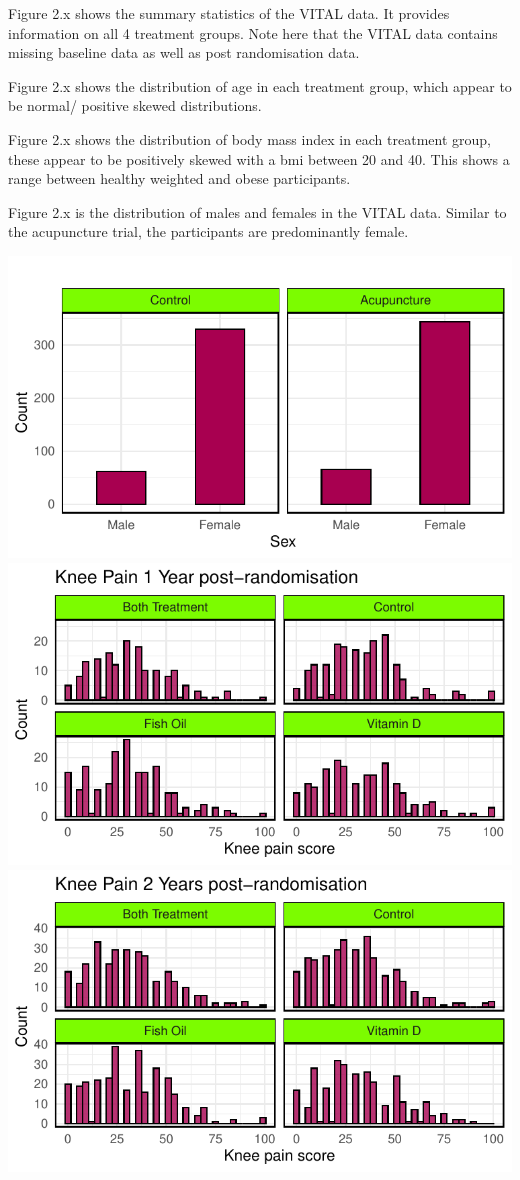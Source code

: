 \documentclass{article}
\begin{document}
Figure 2.x shows the summary statistics of the VITAL data. It provides
information on all 4 treatment groups. Note here that the VITAL data
contains missing baseline data as well as post randomisation data.

Figure 2.x shows the distribution of age in each treatment group, which
appear to be normal/ positive skewed distributions.

Figure 2.x shows the distribution of body mass index in each treatment
group, these appear to be positively skewed with a bmi between 20 and
40. This shows a range between healthy weighted and obese participants.

Figure 2.x is the distribution of males and females in the VITAL data.
Similar to the acupuncture trial, the participants are predominantly
female.

\includegraphics{Final_Report_files/figure-latex/unnamed-chunk-7-1.pdf}
\includegraphics{Final_Report_files/figure-latex/unnamed-chunk-7-2.pdf}
\includegraphics{Final_Report_files/figure-latex/unnamed-chunk-7-3.pdf}
\end{document}
